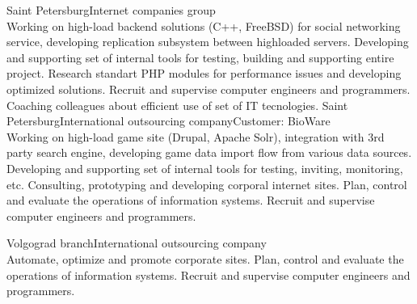 \documentclass[10pt,a4paper]{moderncv}
\begin{document}
    {Saint Petersburg}{Internet companies group}{\\
			Working on high-load backend solutions (C++, FreeBSD) for social networking service, developing replication subsystem between highloaded servers.
			Developing and supporting set of internal tools for testing, building and supporting entire project.
			Research standart PHP modules for performance issues and developing optimized solutions.
			Recruit and supervise computer engineers and programmers. Coaching colleagues about efficient use of set of IT tecnologies.
		\newline{}
    }
    {Saint Petersburg}{International outsourcing company}{Customer: BioWare\\
			Working on high-load game site (Drupal, Apache Solr), integration with 3rd party search engine, developing game data import flow from various data sources.
			Developing and supporting set of internal tools for testing, inviting, monitoring, etc. 
			Consulting, prototyping and developing corporal internet sites. 
			Plan, control and evaluate the operations of information systems. 
			Recruit and supervise computer engineers and programmers. 
		\newline{}
    }
	  
    {Volgograd branch}{International outsourcing company}{\\
			Automate, optimize and promote corporate sites.
			Plan, control and evaluate the operations of information systems. 
			Recruit and supervise computer engineers and programmers. 
		\newline{}
    }
	  
\end{document}
